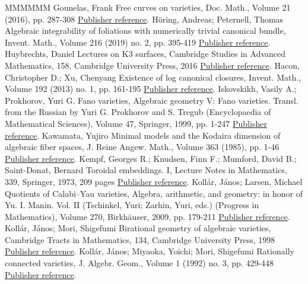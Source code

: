 \begin{thebibliography}{MMMMMM}
 Gounelas, Frank Free curves on varieties, Doc. Math., Volume 21 (2016), pp. 287-308 \href{https://ahl.centre-mersenne.org/item/AHL_2020__3__473_0/#Gou16}{Publisher reference}.
 Höring, Andreas; Peternell, Thomas Algebraic integrability of foliations with numerically trivial canonical bundle, Invent. Math., Volume 216 (2019) no. 2, pp. 395-419 \href{https://ahl.centre-mersenne.org/item/AHL_2020__3__473_0/#HP17}{Publisher reference}.
 Huybrechts, Daniel Lectures on K3 surfaces, Cambridge Studies in Advanced Mathematics, 158, Cambridge University Press, 2016 \href{https://ahl.centre-mersenne.org/item/AHL_2020__3__473_0/#Huy16}{Publisher reference}.
 Hacon, Christopher D.; Xu, Chenyang Existence of log canonical closures, Invent. Math., Volume 192 (2013) no. 1, pp. 161-195 \href{https://ahl.centre-mersenne.org/item/AHL_2020__3__473_0/#HX13}{Publisher reference}.
 Iskovskikh, Vasily A.; Prokhorov, Yuri G. Fano varieties, Algebraic geometry V: Fano varieties. Transl. from the Russian by Yuri G. Prokhorov and S. Tregub (Encyclopaedia of Mathematical Sciences), Volume 47, Springer, 1999, pp. 1-247 \href{https://ahl.centre-mersenne.org/item/AHL_2020__3__473_0/#IP99}{Publisher reference}.
 Kawamata, Yujiro Minimal models and the Kodaira dimension of algebraic fiber spaces, J. Reine Angew. Math., Volume 363 (1985), pp. 1-46 \href{https://ahl.centre-mersenne.org/item/AHL_2020__3__473_0/#Kaw85b}{Publisher reference}.
 Kempf, Georges R.; Knudsen, Finn F.; Mumford, David B.; Saint-Donat, Bernard Toroidal embeddings. I, Lecture Notes in Mathematics, 339, Springer, 1973, 209 pages \href{https://ahl.centre-mersenne.org/item/AHL_2020__3__473_0/#KKMS}{Publisher reference}.
 Kollár, János; Larsen, Michael Quotients of Calabi–Yau varieties, Algebra, arithmetic, and geometry: in honor of Yu. I. Manin. Vol. II (Tschinkel, Yuri; Zarhin, Yuri, eds.) (Progress in Mathematics), Volume 270, Birkhäuser, 2009, pp. 179-211 \href{https://ahl.centre-mersenne.org/item/AHL_2020__3__473_0/#KL09}{Publisher reference}.
 Kollár, János; Mori, Shigefumi Birational geometry of algebraic varieties, Cambridge Tracts in Mathematics, 134, Cambridge University Press, 1998 \href{https://ahl.centre-mersenne.org/item/AHL_2020__3__473_0/#KM98}{Publisher reference}.
 Kollár, János; Miyaoka, Yoichi; Mori, Shigefumi Rationally connected varieties, J. Algebr. Geom., Volume 1 (1992) no. 3, pp. 429-448 \href{https://ahl.centre-mersenne.org/item/AHL_2020__3__473_0/#KMM92}{Publisher reference}.

\end{thebibliography}

